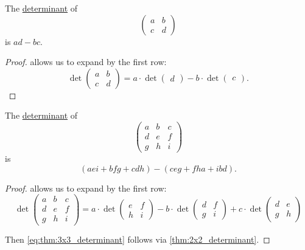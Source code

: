 \begin{corollary}\label{thm:2x2_determinant}
  The \hyperref[def:matrix_determinant]{determinant} of
  \begin{equation*}
    \begin{pmatrix}
      a & b \\
      c & d
    \end{pmatrix}
  \end{equation*}
  is \( ad - bc \).
\end{corollary}
\begin{proof}
   allows us to expand by the first row:
  \begin{equation*}
    \det \begin{pmatrix}
      a & b \\
      c & d
    \end{pmatrix}
    =
    a \cdot \det \begin{pmatrix} d \end{pmatrix} - b \cdot \det \begin{pmatrix} c \end{pmatrix}.
  \end{equation*}
\end{proof}

\begin{corollary}\label{thm:3x3_determinant}
  The \hyperref[def:matrix_determinant]{determinant} of
  \begin{equation*}
    \begin{pmatrix}
      a & b & c \\
      d & e & f \\
      g & h & i
    \end{pmatrix}
  \end{equation*}
  is
  \begin{equation}\label{eq:thm:3x3_determinant}
    (aei + bfg + cdh) - (ceg + fha + ibd).
  \end{equation}
\end{corollary}
\begin{proof}
   allows us to expand by the first row:
  \begin{equation*}
    \det \begin{pmatrix}
      a & b & c \\
      d & e & f \\
      g & h & i
    \end{pmatrix}
    =
    a \cdot \det \begin{pmatrix}
      e & f \\
      h & i
    \end{pmatrix}
    -
    b \cdot \det \begin{pmatrix}
      d & f \\
      g & i
    \end{pmatrix}
    +
    c \cdot \det \begin{pmatrix}
      d & e \\
      g & h
    \end{pmatrix}
  \end{equation*}

  Then \eqref{eq:thm:3x3_determinant} follows via \cref{thm:2x2_determinant}.
\end{proof}

